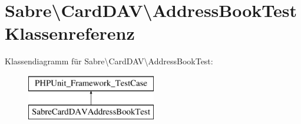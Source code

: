 \hypertarget{class_sabre_1_1_card_d_a_v_1_1_address_book_test}{}\section{Sabre\textbackslash{}Card\+D\+AV\textbackslash{}Address\+Book\+Test Klassenreferenz}
\label{class_sabre_1_1_card_d_a_v_1_1_address_book_test}
Klassendiagramm für Sabre\textbackslash{}Card\+D\+AV\textbackslash{}Address\+Book\+Test\+:\begin{figure}[H]
\begin{center}
\leavevmode
\includegraphics[height=2.000000cm]{class_sabre_1_1_card_d_a_v_1_1_address_book_test}
\end{center}
\end{figure}
